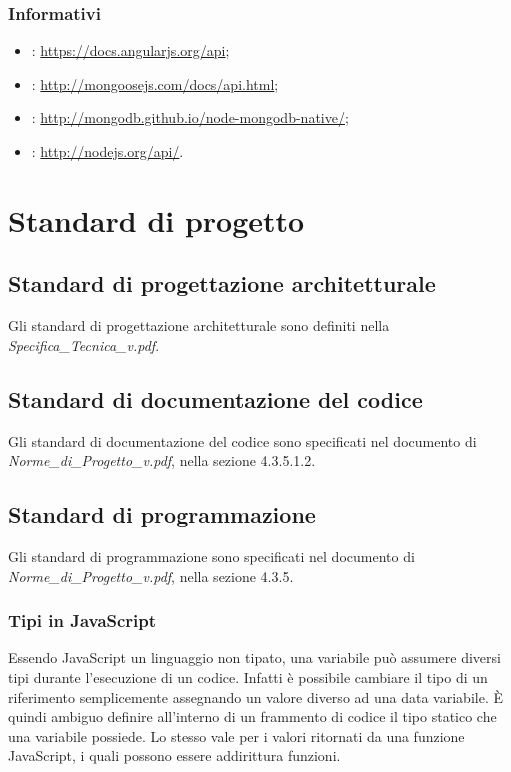 \subsubsection{Informativi}
\begin{itemize}
\item {}: \url{https://docs.angularjs.org/api};
\item {}: \url{http://mongoosejs.com/docs/api.html};
\item {}: \url{http://mongodb.github.io/node-mongodb-native/};
\item {}: \url{http://nodejs.org/api/}.
\end{itemize}

\newpage
\section{Standard di progetto}
\subsection{Standard di progettazione architetturale}
Gli standard di progettazione architetturale sono definiti nella \emph{Specifica\_{}Tecnica\_{}v\versioneSpecificaTecnica{}.pdf}.

\subsection{Standard di documentazione del codice}
Gli standard di documentazione del codice sono specificati nel documento di 
\emph{Norme\_{}di\_{}Progetto\_{}v\versioneNormeDiProgetto{}.pdf}, nella sezione 4.3.5.1.2.	%

\subsection{Standard di programmazione}
Gli standard di programmazione sono specificati nel documento di 
\emph{Norme\_{}di\_{}Progetto\_{}v\versioneNormeDiProgetto{}.pdf}, nella sezione 4.3.5.	%
\subsubsection{Tipi in JavaScript}
Essendo JavaScript un linguaggio non tipato, una variabile può assumere diversi tipi durante l'esecuzione
di un codice. Infatti è possibile cambiare il tipo di un riferimento semplicemente assegnando un valore diverso ad
una data variabile. \`{E} quindi ambiguo definire all'interno di un frammento di codice il tipo statico che una variabile
possiede. Lo stesso vale per i valori ritornati da una funzione JavaScript, i quali possono essere addirittura funzioni.



